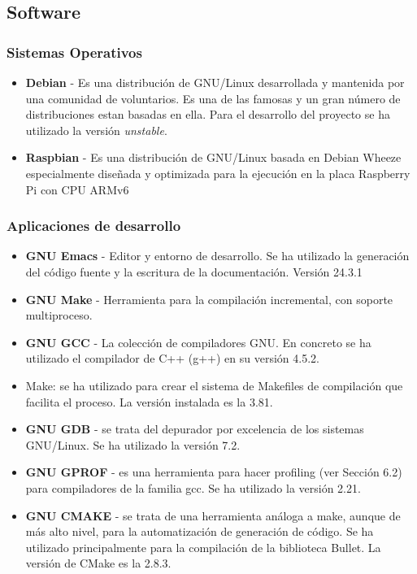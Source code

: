 \subsection{Software}
\subsubsection{Sistemas Operativos}

\begin{itemize}
\item \textbf{Debian} - Es una distribución de GNU/Linux desarrollada y mantenida por una comunidad de voluntarios. Es una de las famosas y un gran número de distribuciones estan basadas en ella. Para el desarrollo del proyecto se ha utilizado la versión \emph{unstable}. 

\item \textbf{Raspbian} - Es una distribución de GNU/Linux basada en Debian Wheeze especialmente diseñada y optimizada para la ejecución en la placa Raspberry Pi con  CPU ARMv6   
\end{itemize}

\subsubsection{Aplicaciones de desarrollo}
\begin{itemize}
\item \textbf{GNU Emacs} - Editor y entorno de desarrollo. Se ha utilizado la generación del código fuente y la escritura de la documentación. Versión 24.3.1
\item \textbf{GNU Make} - Herramienta para la compilación incremental, con soporte multiproceso.
\item \textbf{GNU GCC} - La colección de compiladores GNU. En concreto se ha utilizado el compilador de C++ (g++) en su versión 4.5.2.
\item Make: se ha utilizado para crear el sistema de Makefiles de compilación que facilita el proceso. La versión instalada es la 3.81.
\item \textbf{GNU GDB} - se trata del depurador por excelencia de los sistemas GNU/Linux. Se ha utilizado la versión 7.2.
\item \textbf{GNU GPROF} - es una herramienta para hacer profiling (ver Sección 6.2) para compiladores de la familia gcc. Se ha utilizado la versión 2.21.
\item \textbf{GNU CMAKE} - se trata de una herramienta análoga a make, aunque de más alto nivel, para la automatización de generación de código. Se ha utilizado principalmente para la compilación de la biblioteca Bullet. La versión de CMake es la 2.8.3. 
\end{itemize}

